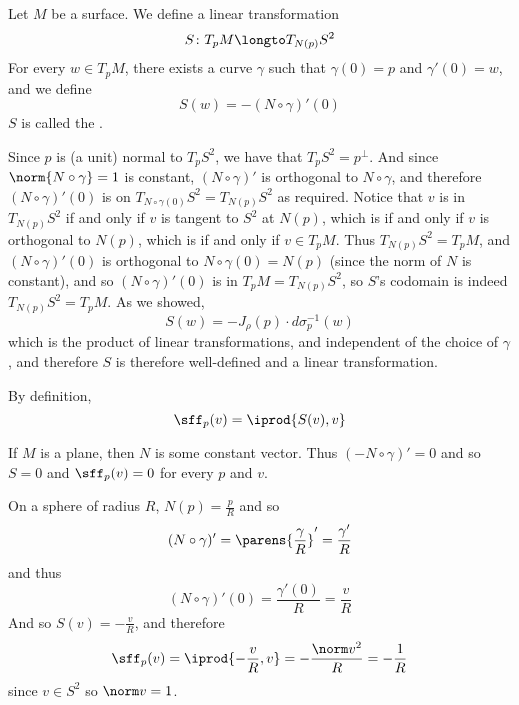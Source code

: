 \begin{defn*}

    Let $M$ be a surface.
    We define a linear transformation
    \[ S\colon T_pM\longto T_{N(p)}S^2 \]
    For every $w\in T_pM$, there exists a curve $\gamma$ such that $\gamma(0)=p$ and $\gamma'(0)=w$, and we define
    \[ S(w) = -(N\circ\gamma)'(0) \]
    $S$ is called the .

\end{defn*}

Since $p$ is (a unit) normal to $T_pS^2$, we have that $T_pS^2=p^\perp$.
And since $\norm{N\circ\gamma}=1$ is constant, $(N\circ\gamma)'$ is orthogonal to $N\circ\gamma$, and therefore $(N\circ\gamma)'(0)$ is on $T_{N\circ\gamma(0)}S^2=T_{N(p)}S^2$ as required.
Notice that $v$ is in $T_{N(p)}S^2$ if and only if $v$ is tangent to $S^2$ at $N(p)$, which is if and only if $v$ is orthogonal to $N(p)$, which is if and only if $v\in T_pM$.
Thus $T_{N(p)}S^2=T_pM$, and $(N\circ\gamma)'(0)$ is orthogonal to $N\circ\gamma(0)=N(p)$ (since the norm of $N$ is constant), and so $(N\circ\gamma)'(0)$ is in $T_pM=T_{N(p)}S^2$, so $S$'s codomain is
indeed $T_{N(p)}S^2=T_pM$.
As we showed,
\[ S(w) = -J_\rho(p)\cdot d\sigma_p^{-1}(w) \]
which is the product of linear transformations, and independent of the choice of $\gamma$, and therefore $S$ is therefore well-defined and a linear transformation.

By definition,
\[ \sff_p(v) = \iprod{S(v),v} \]

\begin{exam*}

    \benum
        \item If $M$ is a plane, then $N$ is some constant vector.
            Thus $(-N\circ\gamma)'=0$ and so $S=0$ and $\sff_p(v)=0$ for every $p$ and $v$.
        \item On a sphere of radius $R$, $N(p)=\frac pR$ and so
            \[ (N\circ\gamma)' = \parens{\frac\gamma R}' = \frac{\gamma'}R \]
            and thus
            \[ (N\circ\gamma)'(0)=\frac{\gamma'(0)}R = \frac vR \]
            And so $S(v)=-\frac vR$, and therefore
            \[ \sff_p(v) = \iprod{-\frac vR,v} = -\frac{\norm v^2}R = -\frac1R \]
            since $v\in S^2$ so $\norm v=1$.
    \eenum

\end{exam*}

